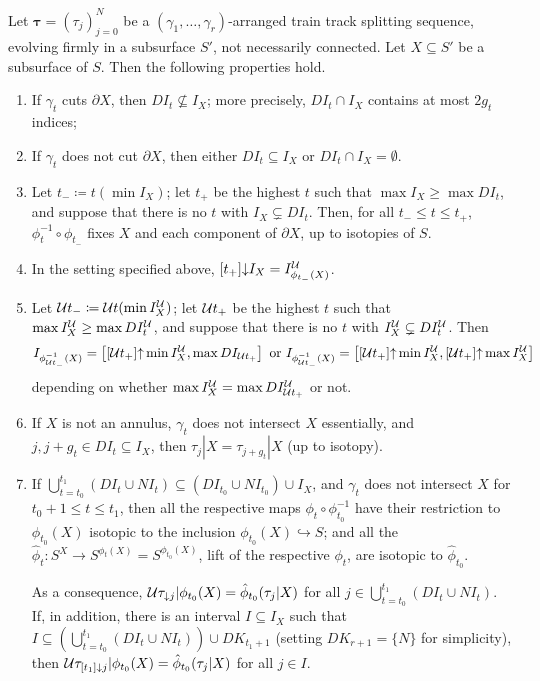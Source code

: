\begin{lemma}\label{lem:untwistedsubsurfaces}
Let $\bm\tau=(\tau_j)_{j=0}^N$ be a $(\gamma_1,\ldots,\gamma_r)$-arranged train track splitting sequence, evolving firmly in a subsurface $S'$, not necessarily connected. Let $X\subseteq S'$ be a subsurface of $S$. Then the following properties hold.
\begin{enumerate}
\item If $\gamma_t$ cuts $\partial X$, then $DI_t\not\subseteq I_X$; more precisely, $DI_t\cap I_X$ contains at most $2g_t$ indices;
\item If $\gamma_t$ does not cut $\partial X$, then either $DI_t\subseteq I_X$ or $DI_t\cap I_X=\emptyset$.
\item Let $t_-\coloneqq t(\min I_X)$; let $t_+$ be the highest $t$ such that $\max I_X\geq \max DI_t$, and suppose that there is no $t$ with $I_X\subsetneq DI_t$. Then, for all $t_-\leq t\leq t_+$, $\phi_t^{-1}\circ \phi_{t_-}$ fixes $X$  and each component of $\partial X$, up to isotopies of $S$.
\item In the setting specified above, $[t_+]\mathord{\downarrow} I_X=I_{\phi_{t_-}(X)}^{\mathcal U}$.
\item Let ${\mathcal U} t_- \coloneqq {\mathcal U} t(\min I_X^{\mathcal U})$; let ${\mathcal U} t_+$ be the highest $t$ such that $\max I_X^{\mathcal U} \geq \max DI_t^{\mathcal U}$, and suppose that there is no $t$ with $I_X^{\mathcal U}\subsetneq DI_t^{\mathcal U}$. Then
$$I_{\phi_{{\mathcal U} t_-}^{-1}(X)}= \left[[{\mathcal U} t_+]\mathord{\uparrow} \min I_X^{\mathcal U}, \max DI_{{\mathcal U} t_+}\right]
\text{ or }
I_{\phi_{{\mathcal U} t_-}^{-1}(X)}= \left[[{\mathcal U} t_+]\mathord{\uparrow} \min I_X^{\mathcal U},[{\mathcal U} t_+]\mathord{\uparrow} \max I_X^{\mathcal U}\right]
$$ depending on whether $\max I_X^{\mathcal U}=\max DI_{{\mathcal U} t_+}^{\mathcal U}$ or not.
\item If $X$ is not an annulus, $\gamma_t$ does not intersect $X$ essentially, and $j, j+g_t\in DI_t\subseteq I_X$, then $\tau_j|X=\tau_{j+g_t}|X$ (up to isotopy).

\item If $\bigcup_{t=t_0}^{t_1} (DI_t\cup NI_t)\subseteq (DI_{t_0}\cup NI_{t_0})\cup I_X$, and $\gamma_t$ does not intersect $X$ for $t_0+1\leq t \leq t_1$, then all the respective maps $\phi_t\circ \phi_{t_0}^{-1}$ have their restriction to $\phi_{t_0}(X)$ isotopic to the inclusion $\phi_{t_0}(X)\hookrightarrow S$; and all the $\hat\phi_t: S^X\rightarrow S^{\phi_t(X)}=S^{\phi_{t_0}(X)}$, lift of the respective $\phi_t$, are isotopic to $\hat\phi_{t_0}$.

As a consequence, ${\mathcal U}\tau_{\mathord{\downarrow} j}|\phi_{t_0}(X)=\hat\phi_{t_0}(\tau_j|X)$ for all $j\in \bigcup_{t=t_0}^{t_1} (DI_t\cup NI_t)$. If, in addition, there is an interval $I\subseteq I_X$ such that $I\subseteq \left(\bigcup_{t=t_0}^{t_1} (DI_t\cup NI_t)\right)\cup DK_{t_1+1}$ (setting $DK_{r+1}=\{N\}$ for simplicity), then ${\mathcal U}\tau_{[t_1]\mathord{\downarrow} j}|\phi_{t_0}(X)=\hat\phi_{t_0}(\tau_j|X)$ for all $j\in I$.
\end{enumerate}
\end{lemma}
